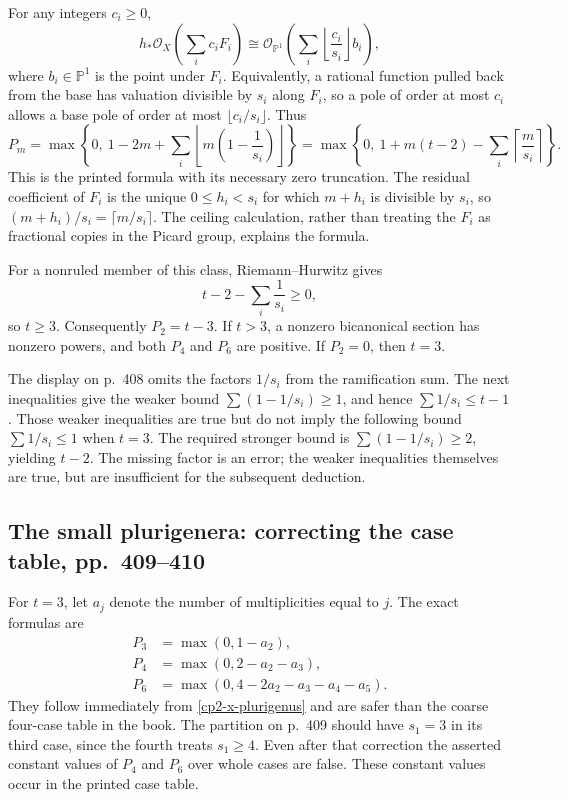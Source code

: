 For any integers $c_i\geq0$,
\[
 h_*\mathcal O_X\left(\sum_i c_iF_i\right)
 \cong\mathcal O_{\mathbb P^1}\left(\sum_i\left\lfloor\frac{c_i}{s_i}\right\rfloor b_i\right),
\]
where $b_i\in\mathbb P^1$ is the point under $F_i$. Equivalently, a rational function pulled back from the base has valuation divisible by $s_i$ along $F_i$, so a pole of order at most $c_i$ allows a base pole of order at most $\lfloor c_i/s_i\rfloor$. Thus
\begin{equation}
\label{cp2-x-plurigenus}
 P_m=\max\left\{0,\ 1-2m+
 \sum_i\left\lfloor m\left(1-\frac1{s_i}\right)\right\rfloor\right\}
 =\max\left\{0,\ 1+m(t-2)-\sum_i\left\lceil\frac m{s_i}\right\rceil\right\}.
\end{equation}
This is the printed formula with its necessary zero truncation. The residual coefficient of $F_i$ is the unique $0\leq h_i<s_i$ for which $m+h_i$ is divisible by $s_i$, so $(m+h_i)/s_i=\lceil m/s_i\rceil$. The ceiling calculation, rather than treating the $F_i$ as fractional copies in the Picard group, explains the formula.

For a nonruled member of this class, Riemann--Hurwitz gives
\[
 t-2-\sum_i\frac1{s_i}\geq0,
\]
so $t\geq3$. Consequently $P_2=t-3$. If $t>3$, a nonzero bicanonical section has nonzero powers, and both $P_4$ and $P_6$ are positive. If $P_2=0$, then $t=3$.

The display on p.~408 omits the factors $1/s_i$ from the ramification sum. The next inequalities give the weaker bound $\sum(1-1/s_i)\geq1$, and hence $\sum1/s_i\leq t-1$. Those weaker inequalities are true but do not imply the following bound $\sum1/s_i\leq1$ when $t=3$. The required stronger bound is $\sum(1-1/s_i)\geq2$, yielding $t-2$. The missing factor is an error; the weaker inequalities themselves are true, but are insufficient for the subsequent deduction.

\subsection{The small plurigenera: correcting the case table, pp.~409--410}

For $t=3$, let $a_j$ denote the number of multiplicities equal to $j$. The exact formulas are
\begin{align*}
 P_3&=\max(0,1-a_2),\\
 P_4&=\max(0,2-a_2-a_3),\\
 P_6&=\max(0,4-2a_2-a_3-a_4-a_5).
\end{align*}
They follow immediately from \eqref{cp2-x-plurigenus} and are safer than the coarse four-case table in the book. The partition on p.~409 should have $s_1=3$ in its third case, since the fourth treats $s_1\geq4$. Even after that correction the asserted constant values of $P_4$ and $P_6$ over whole cases are false. These constant values occur in the printed case table.

